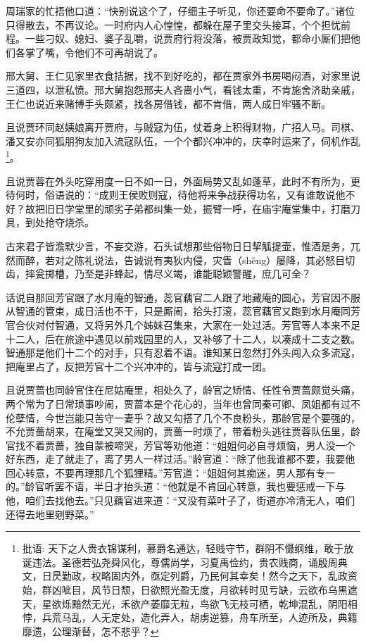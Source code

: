 \documentclass[12pt,oneside]{book}
\begin{document}
周瑞家的忙捂他口道：“快别说这个了，仔细主子听见，你还要命不要命了。”诸位只得散去，不再议论。一时府内人心惶惶，都躲在屋子里交头接耳，个个担忧前程。一些刁奴、媳妇、婆子乱嚼，说贾府行将没落，被贾政知觉，都命小厮们把他们各掌了嘴，令他们不可再胡说了。

邢大舅、王仁见家里衣食拮据，找不到好吃的，都在贾家外书房喝闷酒，对家里说三道四，以泄私愤。邢大舅抱怨邢夫人吝啬小气，看钱太重，不肯施舍济助亲戚，王仁也说近来赌博手头颇紧，找各房借钱，都不肯借，两人成日牢骚不断。

且说贾环同赵姨娘离开贾府，与贼寇为伍，仗着身上积得财物，广招人马。司棋、潘又安亦同狐朋狗友加入流寇队伍，一个个都兴冲冲的，庆幸时运来了，伺机作乱\footnote{批语: 天下之人贵衣锦谋利，慕爵名通达，轻贱守节，群阴不慑纲维，敢于放诞违法。圣德若弘尧舜风化，尊儒尚学，习夏禹俭约，贵农贱商，诵殷周典文，日昃勤政，权略固内外，亟定列爵，乃民何其幸矣！然今之天下，乱政资始，群凶呲目，风节日颓，日欲照光盈无度，月欲转时见亏缺，云欲布乌黑遮天，星欲烁黯然无光，禾欲产萎靡无粒，鸟欲飞无枝可栖，乾坤混乱，阴阳相悖，兵荒马乱，人无定处，造化弄人，胡虏逆篡，舟车所至，人迹所及，典籍靡遗，公理渐替，怎不悲乎？}。

且说贾蓉在外头吃穿用度一日不如一日，外面局势又乱如蓬草，此时不有所为，更待何时，俗语说的：“成则王侯败则寇，待他将来争战获得功名，又有谁敢说他不好？故把旧日学堂里的顽劣子弟都纠集一处，振臂一呼，在庙宇庵堂集中，打磨刀具，到处抢夺烧杀。

古来君子皆澹默少言，不妄交游，石头试想那些俗物日日挈觚提壶，惟酒是务，兀然而醉，若对之陈礼说法，告诚说有夷狄内侵，灾眚（shěng）屡降，其必怒目切齿，摔瓮掷槽，乃至是非蜂起，情尽义竭，谁能聪颖警醒，庶几可全？

话说自那回芳官跟了水月庵的智通，蕊官藕官二人跟了地藏庵的圆心，芳官因不服从智通的管束，成日活也不干，只是厮闹，拾头打滚，蕊官藕官又跑到水月庵同芳官合伙对付智通，又将另外几个姊妹召集来，大家在一处过活。芳官等人本来不足十二人，后在旅途中遇见以前戏园里的人，又补够了十二人，以凑成十二支之数。智通那是他们十二个的对手，只有忍着不语。谁知某日忽然打外头闯入众多流寇，把庵里占了，反把芳官十二个兴冲冲的，皆与流寇打成一团。

且说贾蔷也同龄官住在尼姑庵里，相处久了，龄官之矫情、任性令贾蔷颇觉头痛，两个常为了日常琐事吵闹，贾蔷本是个花心的，当年也曾同秦可卿、凤姐都有过不伦孽情，今世岂能只苦守一妻乎？故又勾搭了几个不良粉头，那龄官是个要强的，不允贾蔷胡来，在庵堂又哭又闹的，贾蔷一时烦了，带着粉头逃往贾蓉队伍里，龄官找不着贾蔷，独自蒙被啼哭，芳官等劝他道：“姐姐何必自寻烦恼，男人没一个好东西，走了就走了，离了男人一样过活。”龄官道：“除了他我谁都不要，我要他回心转意，不要再理那几个狐狸精。”芳官道：“姐姐何其痴迷，男人那有专一的。”龄官听罢不语，半日才抬头道：“他就是不肯回心转意，我也要惩戒一下与他，咱们去找他去。”只见藕官进来道：“又没有菜叶子了，街道亦冷清无人，咱们还得去地里剜野菜。”
\end{document}
